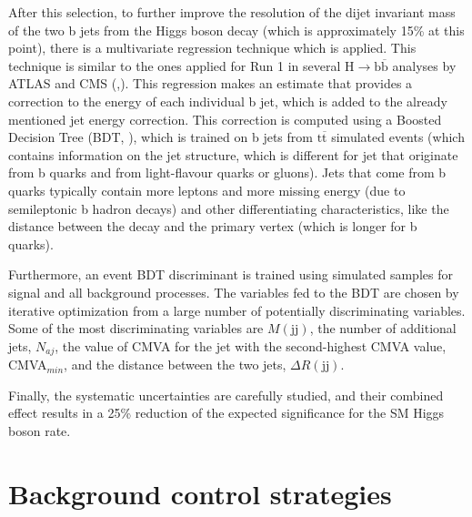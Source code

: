 \documentclass[EPJ,twocolumn]{webofc}
\begin{document}
After this selection, to further improve the resolution of the dijet invariant mass of the two b jets from the Higgs boson decay (which is approximately 15\% at this point), there is a multivariate regression technique which is applied. This technique is similar to the ones applied for Run 1 in several $\text{H} \rightarrow \text{b} \overline{\text{b}}$ analyses by ATLAS and CMS (\cite{higgsatlas},\cite{higgscms}). This regression makes an estimate that provides a correction to the energy of each individual b jet, which is added to the already mentioned jet energy correction. This correction is computed using a Boosted Decision Tree (BDT, \cite{bdt}), which is trained on b jets from $\text{t}\overline{\text{t}}$ simulated events (which contains information on the jet structure, which is different for jet that originate from b quarks and from light-flavour quarks or gluons). Jets that come from b quarks typically contain more leptons and more missing energy (due to semileptonic b hadron decays) and other differentiating characteristics, like the distance between the decay and the primary vertex (which is longer for b quarks).

Furthermore, an event BDT discriminant is trained using simulated samples for signal and all background processes. The variables fed to the BDT are chosen by iterative optimization from a large number of potentially discriminating variables. Some of the most discriminating variables are $M(\text{jj})$, the number of additional jets, $N_{aj}$, the value of CMVA for the jet with the second-highest CMVA value, CMVA$_{min}$, and the distance between the two jets, $\Delta R(\text{jj})$.

Finally, the systematic uncertainties are carefully studied, and their combined effect results in a 25\% reduction of the expected significance for the SM Higgs boson rate.

\section{Background control strategies}
\label{sec:bckgr}
\end{document}
